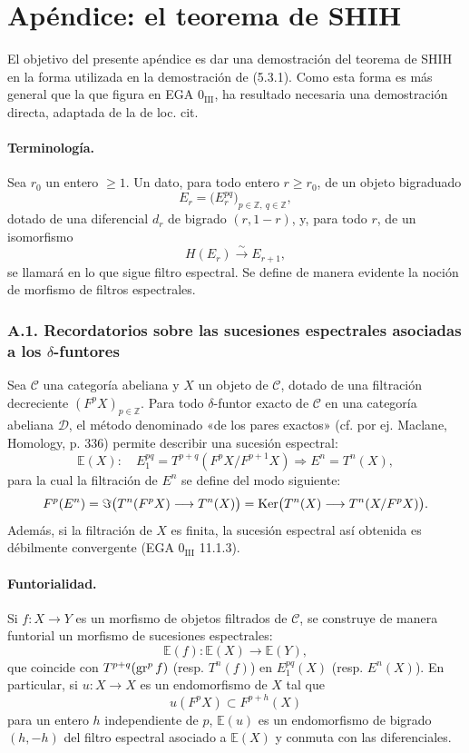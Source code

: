 \section*{Apéndice: el teorema de SHIH}

El objetivo del presente apéndice es dar una demostración del teorema de SHIH en la forma utilizada en la demostración de (5.3.1). Como esta forma es más general que la que figura en EGA \(0_{\mathrm{III}}\), ha resultado necesaria una demostración directa, adaptada de la de loc. cit.

\paragraph{Terminología.}
Sea \(r_0\) un entero \(\ge1\). Un dato, para todo entero \(r\ge r_0\), de un objeto bigraduado
\[
E_r=\bigl(E_r^{pq}\bigr)_{p\in\mathbb Z,\ q\in\mathbb Z},
\]
dotado de una diferencial \(d_r\) de bigrado \((r,1-r)\), y, para todo \(r\), de un isomorfismo
\[
H(E_r)\xrightarrow{\sim}E_{r+1},
\]
se llamará en lo que sigue filtro espectral. Se define de manera evidente la noción de morfismo de filtros espectrales.

\subsubsection*{A.1. Recordatorios sobre las sucesiones espectrales asociadas a los \(\delta\)-funtores}

Sea \(\mathcal C\) una categoría abeliana y \(X\) un objeto de \(\mathcal C\), dotado de una filtración decreciente \((F^pX)_{p\in\mathbb Z}\). Para todo \(\delta\)-funtor exacto de \(\mathcal C\) en una categoría abeliana \(\mathcal D\), el método denominado «de los pares exactos» (cf. por ej. Maclane, Homology, p. 336) permite describir una sucesión espectral:
\[
\mathbb{E}(X):\quad E_1^{pq}=T^{p+q}(F^pX/F^{p+1}X)\Rightarrow E^n=T^n(X),
\]
para la cual la filtración de \(E^n\) se define del modo siguiente:
\[
F^p(E^n)=\Im\bigl(T^n(F^pX)\longrightarrow T^n(X)\bigr)
=\operatorname{Ker}\bigl(T^n(X)\longrightarrow T^n(X/F^pX)\bigr).
\]
Además, si la filtración de \(X\) es finita, la sucesión espectral así obtenida es débilmente convergente (EGA \(0_{\mathrm{III}}\) 11.1.3).

\paragraph{Funtorialidad.}
Si \(f:X\to Y\) es un morfismo de objetos filtrados de \(\mathcal C\), se construye de manera funtorial un morfismo de sucesiones espectrales:
\[
\mathbb{E}(f):\mathbb{E}(X)\longrightarrow \mathbb{E}(Y),
\]
que coincide con \(T^{p+q}(\operatorname{gr}^p f)\) (resp. \(T^n(f)\)) en \(E_1^{pq}(X)\) (resp. \(E^n(X)\)). En particular, si \(u:X\to X\) es un endomorfismo de \(X\) tal que
\[
u(F^pX)\subset F^{p+h}(X)
\]
para un entero \(h\) independiente de \(p\), \(\mathbb{E}(u)\) es un endomorfismo de bigrado \((h,-h)\) del filtro espectral asociado a \(\mathbb{E}(X)\) y conmuta con las diferenciales.
